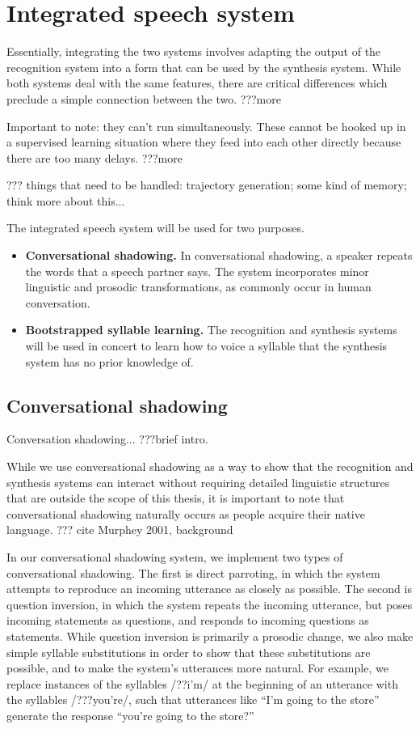 \section{Integrated speech system}

Essentially, integrating the two systems
involves adapting the output of the recognition system
into a form that can be used by the synthesis system.
While both systems deal with the same features,
there are critical differences
which preclude a simple connection between the two.
???more

Important to note: they can't run simultaneously.
These cannot be hooked up in a supervised learning
situation where they feed into each other
directly because there are too many delays.
???more

??? things that need to be handled:
trajectory generation;
some kind of memory;
think more about this...

The integrated speech system
will be used for two purposes.

\begin{itemize}
\item \textbf{Conversational shadowing.} In conversational shadowing,
  a speaker repeats the words that a speech partner says.
  The system incorporates minor linguistic and prosodic transformations,
  as commonly occur in human conversation.
\item \textbf{Bootstrapped syllable learning.}
  The recognition and synthesis systems
  will be used in concert to learn how to voice a syllable
  that the synthesis system has no prior knowledge of.
\end{itemize}

\subsection{Conversational shadowing}

Conversation shadowing... ???brief intro.

While we use conversational shadowing
as a way to show that the recognition
and synthesis systems can interact
without requiring detailed linguistic structures
that are outside the scope of this thesis,
it is important to note that conversational shadowing
naturally occurs as people acquire their native language.
??? cite Murphey 2001, background

In our conversational shadowing system,
we implement two types of conversational shadowing.
The first is direct parroting, in which
the system attempts to reproduce
an incoming utterance as closely as possible.
The second is question inversion, in which
the system repeats the incoming utterance,
but poses incoming statements as questions,
and responds to incoming questions as statements.
While question inversion is primarily
a prosodic change,
we also make simple syllable substitutions
in order to show that these substitutions are possible,
and to make the system's utterances more natural.
For example, we replace instances of the syllables
/??i'm/ at the beginning of an utterance
with the syllables /???you're/,
such that utterances like
``I'm going to the store''
generate the response
``you're going to the store?''

